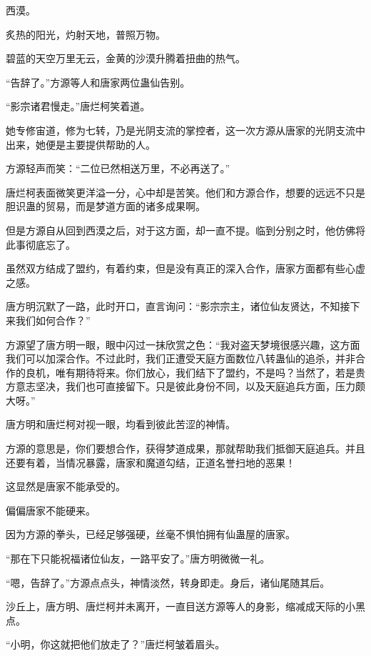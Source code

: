 
\begin{this_body}



西漠。

炙热的阳光，灼射天地，普照万物。

碧蓝的天空万里无云，金黄的沙漠升腾着扭曲的热气。

“告辞了。”方源等人和唐家两位蛊仙告别。

“影宗诸君慢走。”唐烂柯笑着道。

她专修宙道，修为七转，乃是光阴支流的掌控者，这一次方源从唐家的光阴支流中出来，她便是主要提供帮助的人。

方源轻声而笑：“二位已然相送万里，不必再送了。”

唐烂柯表面微笑更洋溢一分，心中却是苦笑。他们和方源合作，想要的远远不只是胆识蛊的贸易，而是梦道方面的诸多成果啊。

但是方源自从回到西漠之后，对于这方面，却一直不提。临到分别之时，他仿佛将此事彻底忘了。

虽然双方结成了盟约，有着约束，但是没有真正的深入合作，唐家方面都有些心虚之感。

唐方明沉默了一路，此时开口，直言询问：“影宗宗主，诸位仙友贤达，不知接下来我们如何合作？”

方源望了唐方明一眼，眼中闪过一抹欣赏之色：“我对盗天梦境很感兴趣，这方面我们可以加深合作。不过此时，我们正遭受天庭方面数位八转蛊仙的追杀，并非合作的良机，唯有期待将来。你们放心，我们结下了盟约，不是吗？当然了，若是贵方意志坚决，我们也可直接留下。只是彼此身份不同，以及天庭追兵方面，压力颇大呀。”

唐方明和唐烂柯对视一眼，均看到彼此苦涩的神情。

方源的意思是，你们要想合作，获得梦道成果，那就帮助我们抵御天庭追兵。并且还要有着，当情况暴露，唐家和魔道勾结，正道名誉扫地的恶果！

这显然是唐家不能承受的。

偏偏唐家不能硬来。

因为方源的拳头，已经足够强硬，丝毫不惧怕拥有仙蛊屋的唐家。

“那在下只能祝福诸位仙友，一路平安了。”唐方明微微一礼。

“嗯，告辞了。”方源点点头，神情淡然，转身即走。身后，诸仙尾随其后。

沙丘上，唐方明、唐烂柯并未离开，一直目送方源等人的身影，缩减成天际的小黑点。

“小明，你这就把他们放走了？”唐烂柯皱着眉头。


\end{this_body}
